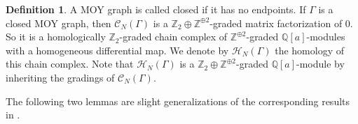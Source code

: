\documentclass{amsart}
\theoremstyle{plain}
\theoremstyle{definition}
\newtheorem{definition}[theorem]{Definition}
\theoremstyle{remark}
\numberwithin{equation}{section}
\begin{document}
\begin{definition}\label{def-homology-MOY}
A MOY graph is called closed if it has no endpoints. If $\Gamma$ is a closed MOY graph, then ${\mathcal{C}}_N(\Gamma)$ is a ${\mathbb{Z}}_2 \oplus {\mathbb{Z}}^{\oplus 2}$-graded matrix factorization of $0$. So it is a homologically ${\mathbb{Z}}_2$-graded chain complex of ${\mathbb{Z}}^{\oplus 2}$-graded ${\mathbb{Q}}[a]$-modules with a homogeneous differential map. We denote by ${\mathcal{H}}_N(\Gamma)$ the homology of this chain complex. Note that ${\mathcal{H}}_N(\Gamma)$ is a ${\mathbb{Z}}_2 \oplus {\mathbb{Z}}^{\oplus 2}$-graded ${\mathbb{Q}}[a]$-module by inheriting the gradings of ${\mathcal{C}}_N(\Gamma)$.
\end{definition}

The following two lemmas are slight generalizations of the corresponding results in \cite{KR1,KR2}.
\end{document}
